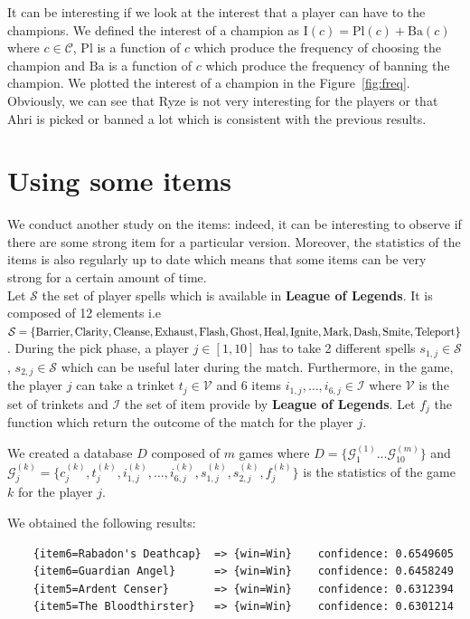 \documentclass{article}
\def\lol{\textbf{League of Legends}}
\def\champion{\mathcal{C}}
\def\interest#1{\text{I}(#1)}
\def\inTplay{\text{Pl}}
\def\inTban{\text{Ba}}
\def\database{D}
\def\summonerItem{\mathcal{I}}
\def\summonerTrinket{\mathcal{V}}
\def\summonerSpell{\mathcal{S}}
\def\game{\mathcal{G}}
\begin{document}
It can be interesting if we look at the interest that a player can have to the champions. We defined the interest of a champion as $\interest{c}=\inTplay(c)+\inTban(c)$ where $c\in\champion$, $\inTplay$ is a function of $c$ which produce the frequency of choosing the champion and $\inTban$ is a function of $c$ which produce the frequency of banning the champion. We plotted the interest of a champion in the Figure~\ref{fig:freq}. Obviously, we can see that Ryze is not very interesting for the players or that Ahri is picked or banned a lot which is consistent with the previous results.

\section{Using some items}

We conduct another study on the items: indeed, it can be interesting to observe if there are some strong item for a particular version. Moreover, the statistics of the items is also regularly up to date which means that some items can be very strong for a certain amount of time.\\ 

Let $\summonerSpell$ the set of player spells which is available in \lol. It is composed of 12 elements i.e $\summonerSpell = \{\text{Barrier}, \text{Clarity}, \text{Cleanse}, \text{Exhaust}, \text{Flash}, \text{Ghost}, \text{Heal}, \text{Ignite}, \text{Mark}, \text{Dash}, \text{Smite}\\, \text{Teleport}\}$. During the pick phase, a player $j\in\left[1,10\right]$ has to take 2 different spells $s_{1,j}\in\summonerSpell$, $s_{2,j}\in\summonerSpell$ which can be useful later during the match. 
Furthermore, in the game, the player $j$ can take a trinket $t_j\in \summonerTrinket$ and 6 items $i_{1,j},\dots, i_{6,j}\in \summonerItem$ where $\summonerTrinket$ is the set of trinkets and $\summonerItem$ the set of item provide by \lol. 
Let $f_{j}$ the function which return the outcome of the match for the player $j$. 

We created a database $\database$ composed of $m$ games where $\database=\{\game^{(1)}_1\dots\game^{(m)}_{10}\}$ and $\game^{(k)}_{j}=\{c_j^{(k)}, t_j^{(k)}, i_{1,j}^{(k)},\dots, i_{6,j}^{(k)}, s_{1,j}^{(k)}, s_{2,j}^{(k)}, f_j^{(k)}\}$ is the statistics of the game $k$ for the player $j$.

We obtained the following results:

\begin{verbatim}
    {item6=Rabadon's Deathcap}  => {win=Win}    confidence: 0.6549605
    {item6=Guardian Angel}      => {win=Win}    confidence: 0.6458249
    {item5=Ardent Censer}       => {win=Win}    confidence: 0.6312394
    {item5=The Bloodthirster}   => {win=Win}    confidence: 0.6301214
\end{verbatim}
\end{document}
